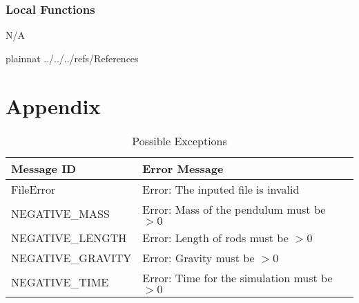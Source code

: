 \documentclass[12pt, titlepage]{article}
\begin{document}
\subsubsection{Local Functions}

N/A
\newpage

 

 {plainnat}
 {../../../refs/References}

\newpage

\section{Appendix} \label{Appendix}
\renewcommand{\arraystretch}{1.2}

\begin{longtable}{l p{12cm}}
\caption{Possible Exceptions} \\
\toprule
\textbf{Message ID} & \textbf{Error Message} \\
\midrule
FileError & Error: The inputed file is invalid\\
NEGATIVE\_MASS & Error: Mass of the pendulum must be $> 0$ \\
NEGATIVE\_LENGTH & Error: Length of rods must be $> 0$ \\
NEGATIVE\_GRAVITY & Error: Gravity must be $> 0$\\
NEGATIVE\_TIME& Error: Time for the simulation must be $> 0$ \\

\bottomrule
\end{longtable}
\end{document}
